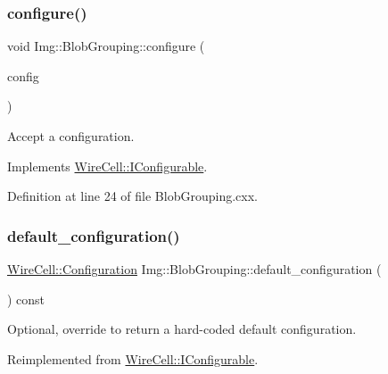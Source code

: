 \subsubsection{\texorpdfstring{configure()}{configure()}}
{\footnotesize\ttfamily void Img\+::\+Blob\+Grouping\+::configure (\begin{DoxyParamCaption}\item[{const \hyperlink{namespace_wire_cell_a9f705541fc1d46c608b3d32c182333ee}{Wire\+Cell\+::\+Configuration} \&}]{config }\end{DoxyParamCaption})\hspace{0.3cm}{\ttfamily [virtual]}}



Accept a configuration. 



Implements \hyperlink{class_wire_cell_1_1_i_configurable_a57ff687923a724093df3de59c6ff237d}{Wire\+Cell\+::\+I\+Configurable}.



Definition at line 24 of file Blob\+Grouping.\+cxx.

\mbox{\label{class_wire_cell_1_1_img_1_1_blob_grouping_ad09392f57e29c6f6d6f600229aea9d44}} 
\subsubsection{\texorpdfstring{default\+\_\+configuration()}{default\_configuration()}}
{\footnotesize\ttfamily \hyperlink{namespace_wire_cell_a9f705541fc1d46c608b3d32c182333ee}{Wire\+Cell\+::\+Configuration} Img\+::\+Blob\+Grouping\+::default\+\_\+configuration (\begin{DoxyParamCaption}{ }\end{DoxyParamCaption}) const\hspace{0.3cm}{\ttfamily [virtual]}}



Optional, override to return a hard-\/coded default configuration. 



Reimplemented from \hyperlink{class_wire_cell_1_1_i_configurable_a54841b2da3d1ea02189478bff96f7998}{Wire\+Cell\+::\+I\+Configurable}.



